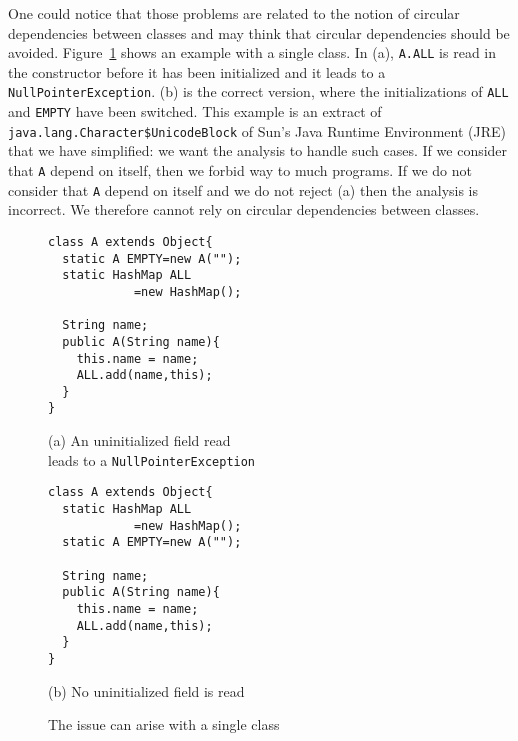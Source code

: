 \documentclass{entcs}
\begin{document}
One could notice that those problems are related to the notion of
circular dependencies between classes and may think that circular
dependencies should be avoided.
Figure~\ref{fig:one-class} shows an example with a single class.  In
(a), \texttt{A.ALL} is read in the constructor before it has been
initialized and it leads to a \texttt{NullPointerException}. (b) is
the correct version, where the initializations of \texttt{ALL} and
\texttt{EMPTY} have been switched.  This example is an extract of
\texttt{java.lang.Character\$UnicodeBlock} of Sun's Java Runtime
Environment (JRE) that we have simplified: we want the analysis to
handle such cases.
If we consider that \texttt{A} depend on itself, then we forbid way to
much programs.  If we do not consider that \texttt{A} depend on itself
and we do not reject (a) then the analysis is incorrect.  We therefore
cannot rely on circular dependencies between classes.

\begin{figure}\normalsize
  \begin{minipage}{.49\linewidth}
\begin{lstlisting}
class A extends Object{
  static A EMPTY=new A("");
  static HashMap ALL
            =new HashMap();

  String name;
  public A(String name){
    this.name = name;
    ALL.add(name,this);
  }
}
\end{lstlisting}
    \begin{center} \footnotesize (a) An uninitialized field read
      \\leads to a \texttt{NullPointerException}
    \end{center}
  \end{minipage}
  \begin{minipage}{.48\linewidth}
\begin{lstlisting}
class A extends Object{
  static HashMap ALL
            =new HashMap();
  static A EMPTY=new A("");

  String name;
  public A(String name){
    this.name = name;
    ALL.add(name,this);
  }
}
\end{lstlisting}
    \begin{center} \footnotesize (b) No uninitialized field is read
    \end{center}
  \end{minipage}

  \caption{The issue can arise with a single class}
  \label{fig:one-class}
\end{figure}
\end{document}
